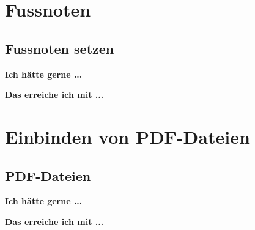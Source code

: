 \documentclass[twoside, 
               a4paper, 
               10pt, 
               parskip=full, 
               sectionentrydots=true, 
               listof=totoc, 
               listof=entryprefix,
               numbers=endperiod]{scrartcl}
\begin{document}

\newpage
\section{Fussnoten}
\subsection{Fussnoten setzen}

{\textbf {Ich hätte gerne ...}}
 
\begin{miniSeite}[colbacktitle=black!35!white,title=Ausdruck]

\end{miniSeite}


\newpage
{\textbf {Das erreiche ich mit ...}}
 
\begin{miniSeite}[colbacktitle=black!35!white,title=\LaTeX-Code]

\end{miniSeite}





\newpage
\section{Einbinden von PDF-Dateien}
\subsection{PDF-Dateien}

{\textbf {Ich hätte gerne ...}}
 
\begin{miniSeite}[colbacktitle=black!35!white,title=Ausdruck]

\end{miniSeite}


\newpage
{\textbf {Das erreiche ich mit ...}}
 
\begin{miniSeite}[colbacktitle=black!35!white,title=\LaTeX-Code]

\end{miniSeite}

\end{document}
